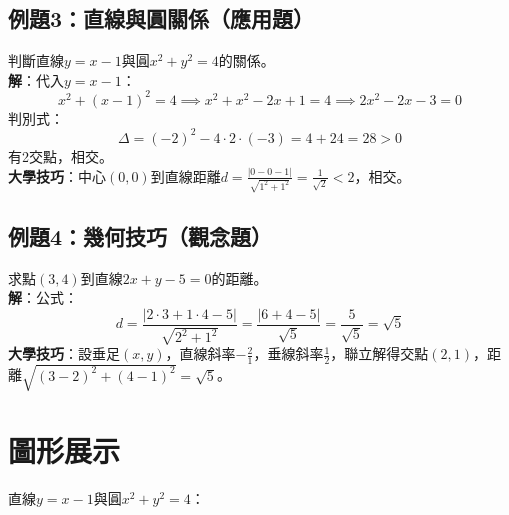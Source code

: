 \subsection{例題3：直線與圓關係（應用題）}
判斷直線$y = x - 1$與圓$x^2 + y^2 = 4$的關係。\\
\textbf{解}：代入$y = x - 1$：
\[
x^2 + (x - 1)^2 = 4 \implies x^2 + x^2 - 2x + 1 = 4 \implies 2x^2 - 2x - 3 = 0
\]
判別式：
\[
\Delta = (-2)^2 - 4 \cdot 2 \cdot (-3) = 4 + 24 = 28 > 0
\]
有2交點，相交。\\
\textbf{大學技巧}：中心$(0, 0)$到直線距離$d = \frac{|0 - 0 - 1|}{\sqrt{1^2 + 1^2}} = \frac{1}{\sqrt{2}} < 2$，相交。

\subsection{例題4：幾何技巧（觀念題）}
求點$(3, 4)$到直線$2x + y - 5 = 0$的距離。\\
\textbf{解}：公式：
\[
d = \frac{|2 \cdot 3 + 1 \cdot 4 - 5|}{\sqrt{2^2 + 1^2}} = \frac{|6 + 4 - 5|}{\sqrt{5}} = \frac{5}{\sqrt{5}} = \sqrt{5}
\]
\textbf{大學技巧}：設垂足$(x, y)$，直線斜率$-\frac{2}{1}$，垂線斜率$\frac{1}{2}$，聯立解得交點$(2, 1)$，距離$\sqrt{(3-2)^2 + (4-1)^2} = \sqrt{5}$。

\section{圖形展示}
直線$y = x - 1$與圓$x^2 + y^2 = 4$：

